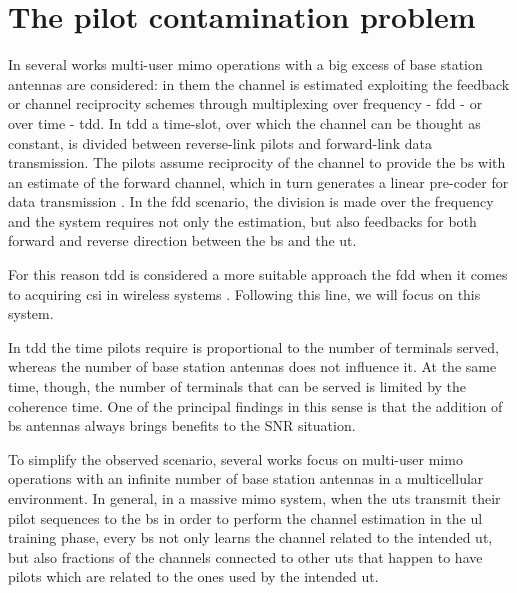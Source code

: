 \documentclass[11pt]{book}
\begin{document}
\section{The pilot contamination problem}
In several works multi-user \gls{mimo} operations with a big excess of base station antennas are considered: in them the channel is estimated exploiting the feedback or channel reciprocity schemes through multiplexing over frequency - \gls{fdd} - or over time - \gls{tdd}. In \gls{tdd} a time-slot, over which the channel can be thought as constant, is divided between reverse-link pilots and forward-link data transmission. The pilots assume reciprocity of the channel to provide the \gls{bs} with an estimate of the forward channel, which in turn generates a linear pre-coder for data transmission \cite{Marzetta2010}. In the \gls{fdd} scenario, the division is made over the frequency and the system requires not only the estimation, but also feedbacks for both forward and reverse direction between the \gls{bs} and the \gls{ut}.

For this reason \gls{tdd} is considered a more suitable approach the \gls{fdd} when it comes to acquiring \gls{csi} in wireless systems \cite{Elijah2016}. Following this line, we will focus on this system.

In \gls{tdd} the time pilots require is proportional to the number of terminals served, whereas the number of base station antennas does not influence it. At the same time, though, the number of terminals that can be served is limited by the coherence time. One of the principal findings in this sense is that the addition of \gls{bs} antennas always brings benefits to the SNR situation.

To simplify the observed scenario, several works focus on multi-user \gls{mimo} operations with an infinite number of base station antennas in a multicellular environment. In general, in a massive \gls{mimo} system, when the \gls{ut}s transmit their pilot sequences to the \gls{bs} in order to perform the channel estimation in the \gls{ul} training phase, every \gls{bs} not only learns the channel related to the intended \gls{ut}, but also fractions of the channels connected to other \gls{ut}s that happen to have pilots which are related to the ones used by the intended \gls{ut}.

\end{document}
